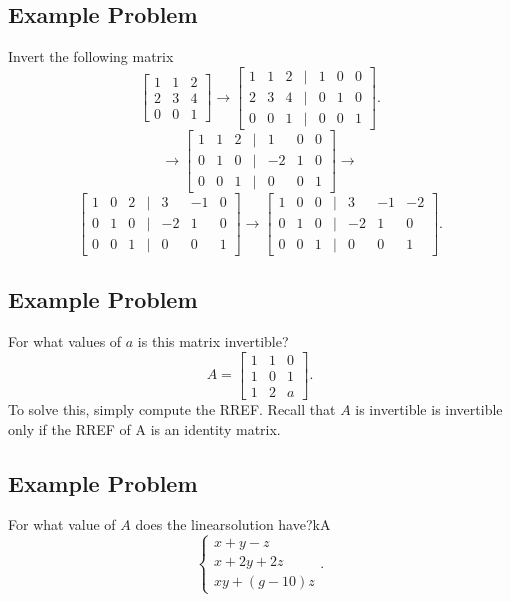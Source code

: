 \documentclass[letterpaper]{report}
\begin{document}
\subsection{Example Problem}%
\label{sub:Example Problem}
Invert the following matrix 
\[
    \begin{bmatrix}
    1 & 1 & 2 \\
    2 & 3 & 4 \\
    0 & 0 & 1 
    \end{bmatrix} \to 
    \begin{bmatrix} 
        1 & 1 & 2 & | & 1 & 0 & 0 \\
        2 & 3 & 4 & | & 0 & 1 & 0 \\
        0 & 0 & 1 & | & 0 & 0 & 1
    \end{bmatrix} 
.\] 
\[
\to 
    \begin{bmatrix} 
        1 & 1 & 2 & | & 1 & 0 & 0 \\
        0 & 1 & 0 & | & -2 & 1 & 0 \\
        0 & 0 & 1 & | & 0 & 0 & 1
    \end{bmatrix} \to 
\]\[
    \begin{bmatrix} 
        1 & 0 & 2 & | & 3 & -1 & 0 \\
        0 & 1 & 0 & | & -2 & 1 & 0 \\
        0 & 0 & 1 & | & 0 & 0 & 1
    \end{bmatrix}  \to 
    \begin{bmatrix} 
        1 & 0 & 0 & | & 3 & -1 & -2 \\
        0 & 1 & 0 & | & -2 & 1 & 0 \\
        0 & 0 & 1 & | & 0 & 0 & 1
    \end{bmatrix} 
.\] 
\subsection{Example Problem}%
\label{sub:Example Problem}
For what values of $a$ is this matrix invertible? 
\[
A = 
\begin{bmatrix} 
    1 & 1 & 0 \\
    1 & 0 & 1 \\
    1 & 2 & a
\end{bmatrix} 
.\] 
To solve this, simply compute the RREF. Recall that $A$ is invertible is invertible only if the RREF of A is an identity matrix. 

\subsection{Example Problem}
\label{sub:}
For what value of $A$ does the linearsolution have?kA
\[
\begin{cases}
    x + y - z \\
    x + 2y + 2z \\
    x y + (g-10)z 
\end{cases}
.\] \\
\end{document}
